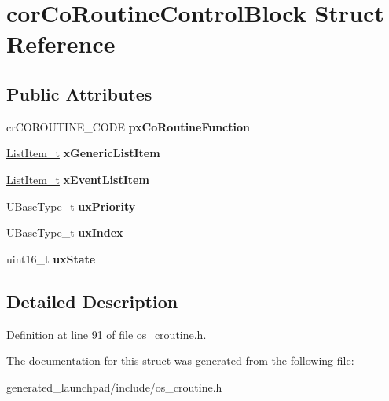 \hypertarget{structcorCoRoutineControlBlock}{}\section{cor\+Co\+Routine\+Control\+Block Struct Reference}
\label{structcorCoRoutineControlBlock}
\subsection*{Public Attributes}
\begin{DoxyCompactItemize}
\item 
\mbox{\label{structcorCoRoutineControlBlock_acc98c7364cd88e8e034a5f9bba113832}} 
cr\+C\+O\+R\+O\+U\+T\+I\+N\+E\+\_\+\+C\+O\+DE {\bfseries px\+Co\+Routine\+Function}
\item 
\mbox{\label{structcorCoRoutineControlBlock_aa2900494db8782eeb8ef12d482501406}} 
\mbox{\hyperlink{structxLIST__ITEM}{List\+Item\+\_\+t}} {\bfseries x\+Generic\+List\+Item}
\item 
\mbox{\label{structcorCoRoutineControlBlock_a105d316da0069f766acc3b210afed1b9}} 
\mbox{\hyperlink{structxLIST__ITEM}{List\+Item\+\_\+t}} {\bfseries x\+Event\+List\+Item}
\item 
\mbox{\label{structcorCoRoutineControlBlock_a752101a5d41b5caa7fd5149436613c8f}} 
U\+Base\+Type\+\_\+t {\bfseries ux\+Priority}
\item 
\mbox{\label{structcorCoRoutineControlBlock_a6c185cd2145f562fb570bea9b158fc81}} 
U\+Base\+Type\+\_\+t {\bfseries ux\+Index}
\item 
\mbox{\label{structcorCoRoutineControlBlock_aa0d702ff5a23c61598fe13e5a78fb1dc}} 
uint16\+\_\+t {\bfseries ux\+State}
\end{DoxyCompactItemize}


\subsection{Detailed Description}


Definition at line 91 of file os\+\_\+croutine.\+h.



The documentation for this struct was generated from the following file\+:\begin{DoxyCompactItemize}
\item 
generated\+\_\+launchpad/include/os\+\_\+croutine.\+h\end{DoxyCompactItemize}
